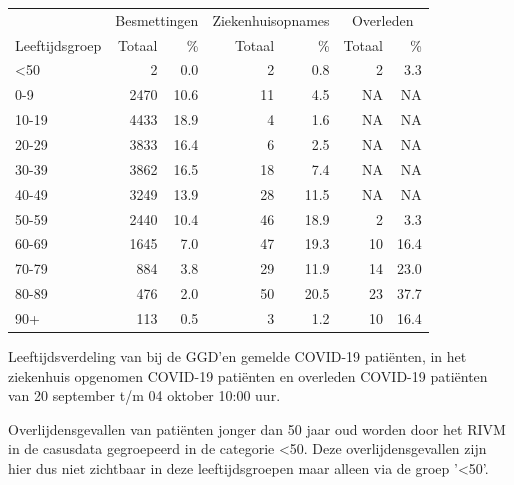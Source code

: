 \documentclass[
  english,
  man,floatsintext]{apa6}
\begin{document}
\begin{table}
\centering\begingroup\fontsize{11}{13}\selectfont

\begin{threeparttable}
\begin{tabular}{lrrrrrr}
\toprule
\multicolumn{1}{c}{ } & \multicolumn{2}{c}{Besmettingen} & \multicolumn{2}{c}{Ziekenhuisopnames} & \multicolumn{2}{c}{Overleden} \\
\cmidrule(l{3pt}r{3pt}){2-3} \cmidrule(l{3pt}r{3pt}){4-5} \cmidrule(l{3pt}r{3pt}){6-7}
Leeftijdsgroep & Totaal & \% & Totaal & \% & Totaal & \%\\
\midrule
<50 & 2 & 0.0 & 2 & 0.8 & 2 & 3.3\\
0-9 & 2470 & 10.6 & 11 & 4.5 & NA & NA\\
10-19 & 4433 & 18.9 & 4 & 1.6 & NA & NA\\
20-29 & 3833 & 16.4 & 6 & 2.5 & NA & NA\\
30-39 & 3862 & 16.5 & 18 & 7.4 & NA & NA\\
40-49 & 3249 & 13.9 & 28 & 11.5 & NA & NA\\
50-59 & 2440 & 10.4 & 46 & 18.9 & 2 & 3.3\\
60-69 & 1645 & 7.0 & 47 & 19.3 & 10 & 16.4\\
70-79 & 884 & 3.8 & 29 & 11.9 & 14 & 23.0\\
80-89 & 476 & 2.0 & 50 & 20.5 & 23 & 37.7\\
90+ & 113 & 0.5 & 3 & 1.2 & 10 & 16.4\\
\bottomrule
\end{tabular}
\begin{tablenotes}
\item[1] Leeftijdsverdeling van bij de GGD’en gemelde COVID-19 patiënten, in het ziekenhuis opgenomen COVID-19 patiënten en overleden COVID-19 patiënten van 20 september t/m 04 oktober 10:00 uur.
\item[2] Overlijdensgevallen van patiënten jonger dan 50 jaar oud worden door het RIVM in de casusdata gegroepeerd in de categorie <50. Deze overlijdensgevallen zijn hier dus niet zichtbaar in deze leeftijdsgroepen maar alleen via de groep '<50'.
\end{tablenotes}
\end{threeparttable}
\endgroup{}
\end{table}

\newpage
\end{document}
